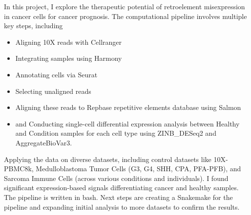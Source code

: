 \documentclass[10pt,letterpaper]{moderncv}
\begin{document}

{}{In this project, I explore the therapeutic potential of retroelement misexpression in cancer cells for cancer prognosis. The computational pipeline involves multiple key steps, including 
\begin{itemize}
\item Aligning 10X reads with Cellranger 
\item Integrating samples using Harmony
\item Annotating cells via Seurat
\item Selecting unaligned reads
\item Aligning these reads to Repbase repetitive elements database using Salmon
\item and Conducting single-cell differential expression analysis between Healthy and Condition samples for each cell type using ZINB\_DESeq2 and AggregateBioVar3. 
\end{itemize}
Applying the data on diverse datasets, including control datasets like 10X-PBMC8k, Medulloblastoma Tumor Cells (G3, G4, SHH, CPA, PFA-PFB), and Sarcoma Immune Cells (across various conditions and individuals). I found significant expression-based signals differentiating cancer and healthy samples. The pipeline is written in bash. Next steps are creating a Snakemake for the pipeline and expanding initial analysis to more datasets to confirm the results.}
\end{document}
